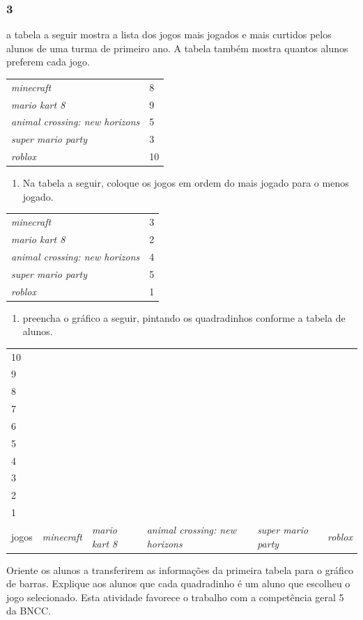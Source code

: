 \subsubsection{3}\label{section-78}

a tabela a seguir mostra a lista dos jogos mais jogados e mais curtidos pelos
alunos de uma turma de primeiro ano. A tabela também mostra quantos alunos preferem cada
jogo.

\begin{longtable}[]{@{}ll@{}}
\toprule
\emph{minecraft} & 8\tabularnewline
\emph{mario kart 8} & 9\tabularnewline
\emph{animal crossing: new horizons} & 5\tabularnewline
\emph{super mario party} & 3\tabularnewline
\emph{roblox} & 10\tabularnewline
\bottomrule
\end{longtable}

\begin{enumerate}
\def\labelenumi{\Alph{enumi})}
\item
  Na tabela a seguir, coloque os jogos em ordem do
  mais jogado para o menos jogado.
\end{enumerate}

\begin{longtable}[]{@{}ll@{}}
\toprule
\emph{minecraft} & 3\tabularnewline
\emph{mario kart 8} & 2\tabularnewline
\emph{animal crossing: new horizons} & 4\tabularnewline
\emph{super mario party} & 5\tabularnewline
\emph{roblox} & 1\tabularnewline
\bottomrule
\end{longtable}


\begin{enumerate}
\def\labelenumi{\Alph{enumi})}
\item
  preencha o gráfico a seguir, pintando os quadradinhos conforme a tabela
  de alunos.
\end{enumerate}

\begin{longtable}[]{@{}llllll@{}}
\toprule
10 & & & & &\tabularnewline
9 & & & & &\tabularnewline
8 & & & & &\tabularnewline
7 & & & & &\tabularnewline
6 & & & & &\tabularnewline
5 & & & & &\tabularnewline
4 & & & & &\tabularnewline
3 & & & & &\tabularnewline
2 & & & & &\tabularnewline
1 & & & & &\tabularnewline
jogos & \emph{minecraft} & \emph{mario kart 8} & \emph{animal crossing:
new horizons} & \emph{super mario party} & \emph{roblox}\tabularnewline
\bottomrule
\end{longtable}

Oriente os alunos a transferirem as informações da
primeira tabela para o gráfico de barras. Explique aos alunos que cada
quadradinho é um aluno que escolheu o jogo selecionado. Esta atividade
favorece o trabalho com a competência geral 5 da BNCC.

